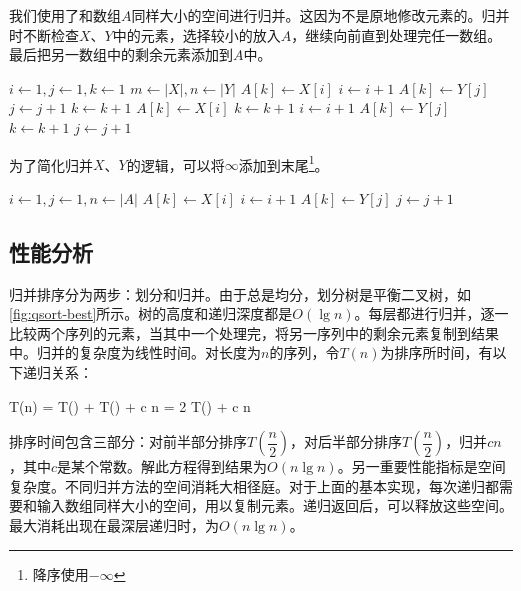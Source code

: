 \documentclass[b5paper]{ctexart}
\begin{document}
我们使用了和数组$A$同样大小的空间进行归并。这因为不是原地修改元素的。归并时不断检查$X$、$Y$中的元素，选择较小的放入$A$，继续向前直到处理完任一数组。最后把另一数组中的剩余元素添加到$A$中。

\begin{algorithmic}[1]
  \State $i \gets 1, j\gets 1, k\gets 1$
  \State $m \gets |X|, n \gets |Y|$
      \State $A[k] \gets X[i]$
      \State $i \gets i + 1$
    \Else
      \State $A[k] \gets Y[j]$
      \State $j \gets j + 1$
    \EndIf
    \State $k \gets k + 1$
  \EndWhile
    \State $A[k] \gets X[i]$
    \State $k \gets k + 1$
    \State $i \gets i + 1$
  \EndWhile
    \State $A[k] \gets Y[j]$
    \State $k \gets k + 1$
    \State $j \gets j + 1$
  \EndWhile
\EndProcedure
\end{algorithmic}

为了简化归并$X$、$Y$的逻辑，可以将$\infty$添加到末尾\footnote{降序使用$-\infty$}。

\begin{algorithmic}[1]
  \State {}
  \State {}
  \State $i \gets 1, j\gets 1, n \gets |A|$
      \State $A[k] \gets X[i]$
      \State $i \gets i + 1$
    \Else
      \State $A[k] \gets Y[j]$
      \State $j \gets j + 1$
    \EndIf
  \EndFor
\EndProcedure
\end{algorithmic}

\subsection{性能分析}

归并排序分为两步：划分和归并。由于总是均分，划分树是平衡二叉树，如\cref{fig:qsort-best}所示。树的高度和递归深度都是$O(\lg n)$。每层都进行归并，逐一比较两个序列的元素，当其中一个处理完，将另一序列中的剩余元素复制到结果中。归并的复杂度为线性时间。对长度为$n$的序列，令$T(n)$为排序所时间，有以下递归关系：

\be
T(n) = T() + T() + c n = 2 T() + c n
\ee

排序时间包含三部分：对前半部分排序$T(\dfrac{n}{2})$，对后半部分排序$T(\dfrac{n}{2})$，归并$c n$，其中$c$是某个常数。解此方程得到结果为$O(n \lg n)$。另一重要性能指标是空间复杂度。不同归并方法的空间消耗大相径庭。对于上面的基本实现，每次递归都需要和输入数组同样大小的空间，用以复制元素。递归返回后，可以释放这些空间。最大消耗出现在最深层递归时，为$O(n \lg n)$。
\end{document}
